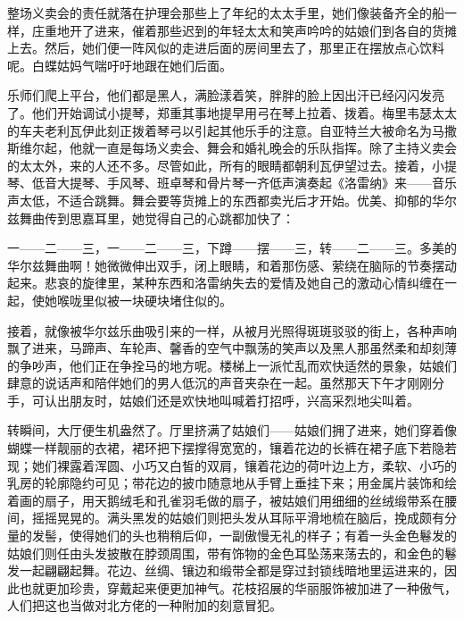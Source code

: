 \par 整场义卖会的责任就落在护理会那些上了年纪的太太手里，她们像装备齐全的船一样，庄重地开了进来，催着那些迟到的年轻太太和笑声吟吟的姑娘们到各自的货摊上去。然后，她们便一阵风似的走进后面的房间里去了，那里正在摆放点心饮料呢。白蝶姑妈气喘吁吁地跟在她们后面。
\par 乐师们爬上平台，他们都是黑人，满脸漾着笑，胖胖的脸上因出汗已经闪闪发亮了。他们开始调试小提琴，郑重其事地提早用弓在琴上拉着、拨着。梅里韦瑟太太的车夫老利瓦伊此刻正拨着琴弓以引起其他乐手的注意。自亚特兰大被命名为马撒斯维尔起，他就一直是每场义卖会、舞会和婚礼晚会的乐队指挥。除了主持义卖会的太太外，来的人还不多。尽管如此，所有的眼睛都朝利瓦伊望过去。接着，小提琴、低音大提琴、手风琴、班卓琴和骨片琴一齐低声演奏起《洛雷纳》来——音乐声太低，不适合跳舞。舞会要等货摊上的东西都卖光后才开始。优美、抑郁的华尔兹舞曲传到思嘉耳里，她觉得自己的心跳都加快了：
\par 一——二——三，一——二——三，下蹲——摆——三，转——二——三。多美的华尔兹舞曲啊！她微微伸出双手，闭上眼睛，和着那伤感、萦绕在脑际的节奏摆动起来。悲哀的旋律里，某种东西和洛雷纳失去的爱情及她自己的激动心情纠缠在一起，使她喉咙里似被一块硬块堵住似的。
\par 接着，就像被华尔兹乐曲吸引来的一样，从被月光照得斑斑驳驳的街上，各种声响飘了进来，马蹄声、车轮声、馨香的空气中飘荡的笑声以及黑人那虽然柔和却刻薄的争吵声，他们正在争拴马的地方呢。楼梯上一派忙乱而欢快适然的景象，姑娘们肆意的说话声和陪伴她们的男人低沉的声音夹杂在一起。虽然那天下午才刚刚分手，可认出朋友时，姑娘们还是欢快地叫喊着打招呼，兴高采烈地尖叫着。
\par 转瞬间，大厅便生机盎然了。厅里挤满了姑娘们——姑娘们拥了进来，她们穿着像蝴蝶一样靓丽的衣裙，裙环把下摆撑得宽宽的，镶着花边的长裤在裙子底下若隐若现；她们裸露着浑圆、小巧又白皙的双肩，镶着花边的荷叶边上方，柔软、小巧的乳房的轮廓隐约可见；带花边的披巾随意地从手臂上垂挂下来；用金属片装饰和绘着画的扇子，用天鹅绒毛和孔雀羽毛做的扇子，被姑娘们用细细的丝绒缎带系在腰间，摇摇晃晃的。满头黑发的姑娘们则把头发从耳际平滑地梳在脑后，挽成颇有分量的发髻，使得她们的头也稍稍后仰，一副傲慢无礼的样子；有着一头金色鬈发的姑娘们则任由头发披散在脖颈周围，带有饰物的金色耳坠荡来荡去的，和金色的鬈发一起翩翩起舞。花边、丝绸、镶边和缎带全都是穿过封锁线暗地里运进来的，因此也就更加珍贵，穿戴起来便更加神气。花枝招展的华丽服饰被加进了一种傲气，人们把这也当做对北方佬的一种附加的刻意冒犯。
